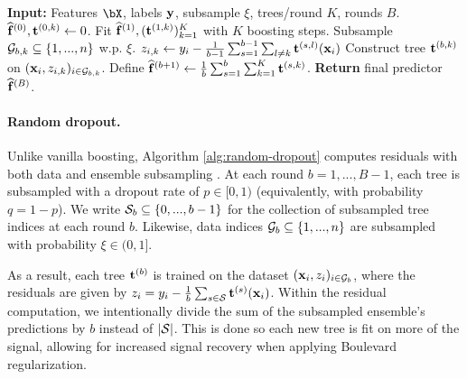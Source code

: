 \begin{algorithm}[H]
    \centering
    \caption{}
        \begin{algorithmic}[1]
        \STATE \textbf{Input:} Features $\bX$, labels $\mathbf{y}$, subsample $\xi$, trees/round $K$, rounds $B$. $\widehat{\mathbf{f}}^{(0)}, \mathbf{t}^{(0,k)} \gets 0$. 
        \STATE Fit $\widehat{\mathbf{f}}^{(1)}, (\mathbf{t}^{(1,k)})_{k=1}^K$ with $K$ boosting steps. 
        \STATE Subsample ${\mathcal{G}}_{b,k} \subseteq \{1,...,n\}$ w.p. $ \xi$.
        \STATE \hspace{-1.1mm} $z_{i,k} \gets y_i - \frac{1}{b-1}\sum_{s=1}^{b-1}\sum_{l\neq k}\mathbf{t}^{(s,l)}(\mathbf{x}_i)$
        \STATE Construct tree $\mathbf{t}^{(b,k)}$ on $(\mathbf{x}_i, z_{i,k})_{i \in {\mathcal{G}}_{b,k}}$.
        \ENDFOR
        \STATE Define $\widehat{\mathbf{f}}^{(b+1)} \gets \frac{1}{b}\sum_{s=1}^{b}\sum_{k=1}^K \mathbf{t}^{(s,k)}$.
        \ENDFOR
        \STATE \textbf{Return} final predictor $\widehat{\mathbf{f}}^{(B)}$.
    \end{algorithmic}
    \label{alg:structured-dropout}
\end{algorithm}%

\vspace{-1ex}
\paragraph{Random dropout.} Unlike vanilla boosting, Algorithm \ref{alg:random-dropout} computes residuals with both data \citep{friedman2002stochasticboosting} and ensemble subsampling \citep{rashmi2015dartdropoutsmeetmultiple}. At each round $b=1,...,B-1$, each tree is subsampled with a dropout rate of $p \in [0,1)$ (equivalently, with probability $q=1-p$). We write ${\mathcal{S}}_b \subseteq \{0,...,b-1\}$ for the collection of subsampled tree indices at each round $b$. Likewise, data indices ${\mathcal{G}}_b \subseteq \{1,...,n\}$ are subsampled with probability $\xi \in (0,1]$. 

As a result, each tree $\mathbf{t}^{(b)}$ is trained on the dataset $(\mathbf{x}_i, z_i)_{i \in {\mathcal{G}}_b}$, where the residuals are given by $z_i = y_i - \frac{1}{b} \sum_{s \in {\mathcal{S}}} \mathbf{t}^{(s)}(\mathbf{x}_i)$. Within the residual computation, we intentionally divide the sum of the subsampled ensemble's predictions by $b$ instead of $|{\mathcal{S}}|$. This is done so each new tree is fit on more of the signal, allowing for increased signal recovery when applying Boulevard regularization. 

